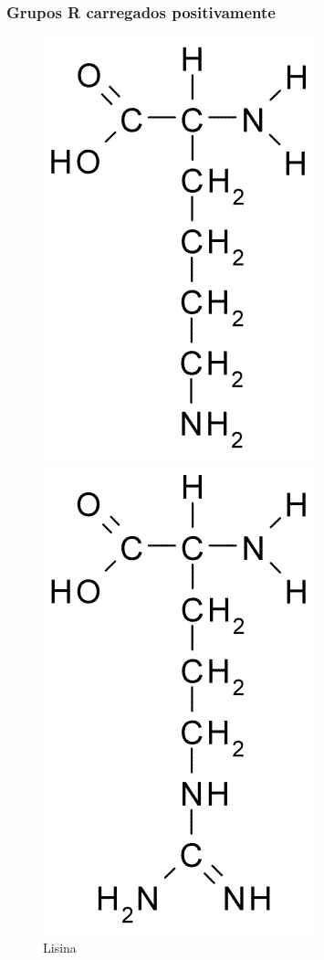 \subsubsection*{Grupos R carregados positivamente}
\begin{figure}[H]
	\begin{center}
		\begin{minipage}{0.3\linewidth}
			\centering   
			\includegraphics[width=0.7\linewidth]{secProteins/figures/lysine.png}	
			\caption{Lisina}
			\label{fig:lysine}
		\end{minipage}
		\begin{minipage}{0.3\linewidth}
			\centering   
			\includegraphics[width=0.59\linewidth]{secProteins/figures/arginine.png}

\end{minipage}
\end{center}
\end{figure}
